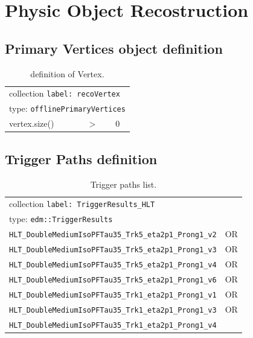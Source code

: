 \section{Physic Object Recostruction}

\subsection{Primary Vertices object definition}

\begin{table}[htb]
	\caption{definition of Vertex.}
	\label{table:vertexobjdefinition}
	\ttfamily\scriptsize\selectfont
	\begin{center}
		\begin{tabular}{|l|ll|}
			\hline
			\multicolumn{3}{|l|}{collection \texttt{label: recoVertex}}\\
			\multicolumn{3}{|l|}{type: \texttt{offlinePrimaryVertices}}\\
			\hline
			vertex.size() & $>$ & 0 \\
			\hline
		\end{tabular}
	\end{center}
\end{table}

\subsection{Trigger Paths definition}

\begin{table}[htb]

	\caption{Trigger paths list.}
	\label{table:triggerdefinition}
	\ttfamily\scriptsize\selectfont
	\begin{center}
		\begin{tabular}{|l|l|}
			\hline
			\multicolumn{2}{|l|}{collection \texttt{label: TriggerResults\_HLT}}\\
			\multicolumn{2}{|l|}{type: \texttt{edm::TriggerResults}}\\
			\hline
			\texttt{HLT\_DoubleMediumIsoPFTau35\_Trk5\_eta2p1\_Prong1\_v2} & OR \\
			\texttt{HLT\_DoubleMediumIsoPFTau35\_Trk5\_eta2p1\_Prong1\_v3} & OR \\
			\texttt{HLT\_DoubleMediumIsoPFTau35\_Trk5\_eta2p1\_Prong1\_v4} & OR \\
			\texttt{HLT\_DoubleMediumIsoPFTau35\_Trk5\_eta2p1\_Prong1\_v6} & OR \\
			\texttt{HLT\_DoubleMediumIsoPFTau35\_Trk1\_eta2p1\_Prong1\_v1} & OR \\
			\texttt{HLT\_DoubleMediumIsoPFTau35\_Trk1\_eta2p1\_Prong1\_v3} & OR \\
			\texttt{HLT\_DoubleMediumIsoPFTau35\_Trk1\_eta2p1\_Prong1\_v4} & \\
			\hline
		\end{tabular}
	\end{center}
\end{table}

